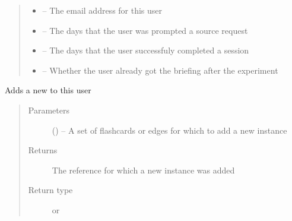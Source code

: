 \documentclass[letterpaper,10pt,english]{sphinxmanual}
\begin{document}
\begin{fulllineitems}
\begin{quote}
\begin{description}
\begin{itemize}
\item {} 
\href{https://docs.python.org/2/library/email.html\#module-email}{} -- The email address for this user

\item {} 
 -- The days that the user was prompted a source request

\item {} 
 -- The days that the user successfuly completed a session

\item {} 
 -- Whether the user already got the briefing after the experiment

\end{itemize}

\end{description}\end{quote}

\begin{fulllineitems}
\label{\detokenize{user:user.User.add_new_instance}}
Adds a new  to this user
\begin{quote}\begin{description}
\item[{Parameters}] \leavevmode
{} (\href{https://docs.python.org/2/library/functions.html\#list}{}\sphinxstyleliteralemphasis{)}\sphinxstyleliteralemphasis{}) -- A set of flashcards or edges for which to add a new instance

\item[{Returns}] \leavevmode
The reference for which a new instance was added

\item[{Return type}] \leavevmode
{\hyperref[\detokenize{flashcard:flashcard.Flashcard}]{}} or {\hyperref[\detokenize{edge:edge.Edge}]{}}

\end{description}\end{quote}


\end{fulllineitems}
\end{fulllineitems}
\end{document}
